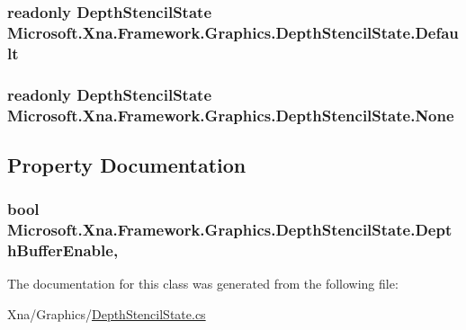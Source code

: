 \subsubsection[{Default}]{\setlength{\rightskip}{0pt plus 5cm}readonly {\bf Depth\+Stencil\+State} Microsoft.\+Xna.\+Framework.\+Graphics.\+Depth\+Stencil\+State.\+Default\hspace{0.3cm}{\ttfamily [static]}}\label{class_microsoft_1_1_xna_1_1_framework_1_1_graphics_1_1_depth_stencil_state_a562894c724fd435d762313d26b2f1b32}
\hypertarget{class_microsoft_1_1_xna_1_1_framework_1_1_graphics_1_1_depth_stencil_state_ae18b482471863cf1d5194ad89420ad58}{}
\subsubsection[{None}]{\setlength{\rightskip}{0pt plus 5cm}readonly {\bf Depth\+Stencil\+State} Microsoft.\+Xna.\+Framework.\+Graphics.\+Depth\+Stencil\+State.\+None\hspace{0.3cm}{\ttfamily [static]}}\label{class_microsoft_1_1_xna_1_1_framework_1_1_graphics_1_1_depth_stencil_state_ae18b482471863cf1d5194ad89420ad58}


\subsection{Property Documentation}
\hypertarget{class_microsoft_1_1_xna_1_1_framework_1_1_graphics_1_1_depth_stencil_state_a5d7e3b15ec82352955eb4acf9d43a446}{}
\subsubsection[{Depth\+Buffer\+Enable}]{\setlength{\rightskip}{0pt plus 5cm}bool Microsoft.\+Xna.\+Framework.\+Graphics.\+Depth\+Stencil\+State.\+Depth\+Buffer\+Enable\hspace{0.3cm}{\ttfamily [get]}, {\ttfamily [set]}}\label{class_microsoft_1_1_xna_1_1_framework_1_1_graphics_1_1_depth_stencil_state_a5d7e3b15ec82352955eb4acf9d43a446}


The documentation for this class was generated from the following file\+:\begin{DoxyCompactItemize}
\item 
Xna/\+Graphics/\hyperlink{_depth_stencil_state_8cs}{Depth\+Stencil\+State.\+cs}\end{DoxyCompactItemize}

